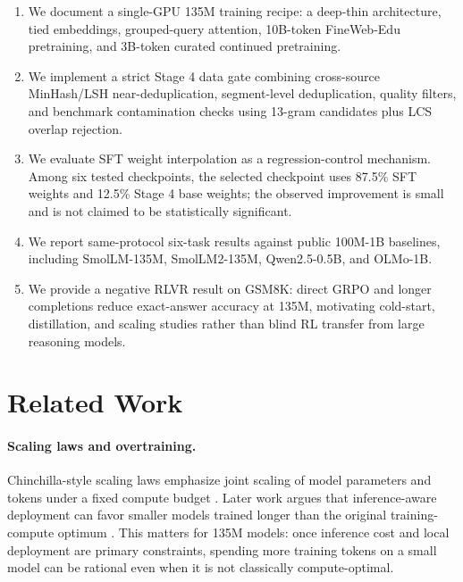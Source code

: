 \documentclass[11pt]{article}
\begin{document}
\begin{enumerate}
  \item We document a single-GPU 135M training recipe: a deep-thin architecture, tied embeddings, grouped-query attention, 10B-token FineWeb-Edu pretraining, and 3B-token curated continued pretraining.
  \item We implement a strict Stage 4 data gate combining cross-source MinHash/LSH near-deduplication, segment-level deduplication, quality filters, and benchmark contamination checks using 13-gram candidates plus LCS overlap rejection.
  \item We evaluate SFT weight interpolation as a regression-control mechanism. Among six tested checkpoints, the selected checkpoint uses 87.5\% SFT weights and 12.5\% Stage 4 base weights; the observed improvement is small and is not claimed to be statistically significant.
  \item We report same-protocol six-task results against public 100M-1B baselines, including SmolLM-135M, SmolLM2-135M, Qwen2.5-0.5B, and OLMo-1B.
  \item We provide a negative RLVR result on GSM8K: direct GRPO and longer completions reduce exact-answer accuracy at 135M, motivating cold-start, distillation, and scaling studies rather than blind RL transfer from large reasoning models.
\end{enumerate}

\section{Related Work}

\paragraph{Scaling laws and overtraining.}
Chinchilla-style scaling laws emphasize joint scaling of model parameters and tokens under a fixed compute budget \citep{hoffmann2022chinchilla}. Later work argues that inference-aware deployment can favor smaller models trained longer than the original training-compute optimum \citep{sardana2024beyondchinchilla}. This matters for 135M models: once inference cost and local deployment are primary constraints, spending more training tokens on a small model can be rational even when it is not classically compute-optimal.
\end{document}

